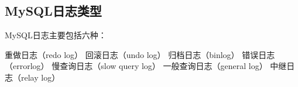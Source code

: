 \documentclass[../../../interview-questions.tex]{subfiles}
\begin{document}
\subsection{MySQL日志类型}

MySQL日志主要包括六种：

重做日志（redo log）
回滚日志（undo log）
归档日志（binlog）
错误日志（errorlog）
慢查询日志（slow query log）
一般查询日志（general log）
中继日志（relay log）
\end{document}
